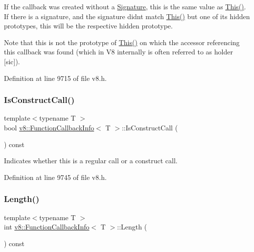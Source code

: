 If the callback was created without a \mbox{\hyperlink{classv8_1_1Signature}{Signature}}, this is the same value as \mbox{\hyperlink{classv8_1_1FunctionCallbackInfo_a4ddfd6d21732dff1c4c55d5441a8a5ca}{This()}}. If there is a signature, and the signature didn\textquotesingle{}t match \mbox{\hyperlink{classv8_1_1FunctionCallbackInfo_a4ddfd6d21732dff1c4c55d5441a8a5ca}{This()}} but one of its hidden prototypes, this will be the respective hidden prototype.

Note that this is not the prototype of \mbox{\hyperlink{classv8_1_1FunctionCallbackInfo_a4ddfd6d21732dff1c4c55d5441a8a5ca}{This()}} on which the accessor referencing this callback was found (which in V8 internally is often referred to as holder \mbox{[}sic\mbox{]}). 

Definition at line 9715 of file v8.\+h.

\mbox{\label{classv8_1_1FunctionCallbackInfo_ad2105b93e9b4d02f42b7338fa5950cbc}} 
\subsubsection{\texorpdfstring{Is\+Construct\+Call()}{IsConstructCall()}}
{\footnotesize\ttfamily template$<$typename T $>$ \\
bool \mbox{\hyperlink{classv8_1_1FunctionCallbackInfo}{v8\+::\+Function\+Callback\+Info}}$<$ T $>$\+::Is\+Construct\+Call (\begin{DoxyParamCaption}{ }\end{DoxyParamCaption}) const}

Indicates whether this is a regular call or a construct call. 

Definition at line 9745 of file v8.\+h.

\mbox{\label{classv8_1_1FunctionCallbackInfo_af97dd3f1cb01ed039f9479152ad63a84}} 
\subsubsection{\texorpdfstring{Length()}{Length()}}
{\footnotesize\ttfamily template$<$typename T $>$ \\
int \mbox{\hyperlink{classv8_1_1FunctionCallbackInfo}{v8\+::\+Function\+Callback\+Info}}$<$ T $>$\+::Length (\begin{DoxyParamCaption}{ }\end{DoxyParamCaption}) const}

